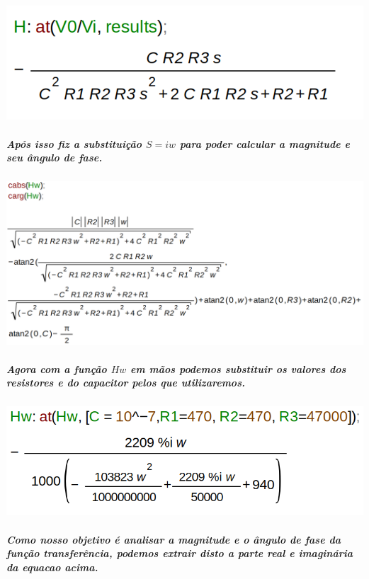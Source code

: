 \documentclass[12pt,twoside, a4paper, twocolumn]{article}
\begin{document}
\subparagraph*{}


\begin{adjustbox}{scale=0.33}
    \includegraphics{H.png}
\end{adjustbox}


\subparagraph*{Após isso fiz a substituição $S = iw$ para poder calcular a magnitude e seu ângulo de fase.}


\subparagraph*{}


\begin{adjustbox}{scale=.17}
    \includegraphics{sjw.png}
\end{adjustbox}


\subparagraph*{Agora com a função $Hw$ em mãos podemos substituir os valores dos resistores e do capacitor pelos que utilizaremos.}


\begin{adjustbox}{scale=0.30}
    \includegraphics{substituicao.png}
\end{adjustbox}


\subparagraph*{Como nosso objetivo é analisar a magnitude e o ângulo de fase da função transferência, podemos extrair disto a parte real e imaginária da equacao acima.}
\end{document}
